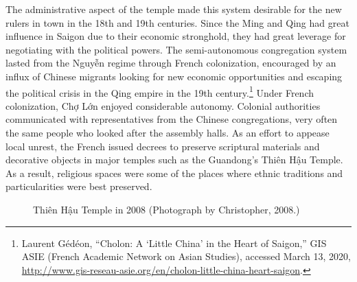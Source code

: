 The administrative aspect of the temple made this system desirable for the new rulers in town in the 18th and 19th centuries. Since the Ming and Qing had great influence in Saigon due to their economic stronghold, they had great leverage for negotiating with the political powers. The semi-autonomous congregation system lasted from the Nguyễn regime through  French colonization, encouraged by an influx of Chinese migrants looking for new economic opportunities and escaping the political crisis in the Qing empire in the 19th century.\footnote{Laurent Gédéon, “Cholon: A ‘Little China’ in the Heart of Saigon,” GIS ASIE (French Academic Network on Asian Studies), accessed March 13, 2020, \url{http://www.gis-reseau-asie.org/en/cholon-little-china-heart-saigon}.} Under French colonization, Chợ Lớn enjoyed considerable autonomy. Colonial authorities communicated with representatives from the Chinese congregations, very often the same people who looked after the assembly halls. As an effort to appease local unrest, the French issued decrees to preserve scriptural materials and decorative objects in major temples such as the Guandong’s Thiên Hậu Temple. As a result, religious spaces were some of the places where ethnic traditions and particularities were best preserved. \en

\begin{figure}[!ht]
\begin{center}
\vspace{-.2 in}
\caption[\vi Thiên Hậu Temple in 2008 \en]{\vi Thiên Hậu Temple in 2008 (Photograph by Christopher, 2008.\footnotemark)\en}\label{thienhau_present}
\end{center}
\vspace{-.35 in}
\end{figure}

